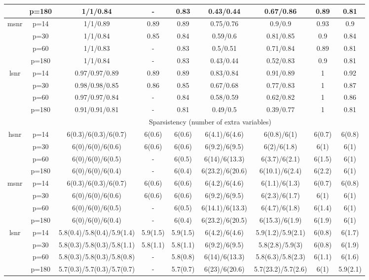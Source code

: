 \begin{table}[ht]
{\begin{tabular}{|c|c|ccccccc|}
   & p=180 & 1/1/0.84 & - & 0.83 & 0.43/0.44 & 0.67/0.86 & 0.89 & 0.81 \\ 
  \midrule\multirow{4}[2]{*}{msnr} & p=14 & 1/1/0.89 & 0.89 & 0.89 & 0.75/0.76 & 0.9/0.9 & 0.93 & 0.9 \\ 
   & p=30 & 1/1/0.84 & 0.85 & 0.84 & 0.59/0.6 & 0.81/0.85 & 0.9 & 0.84 \\ 
   & p=60 & 1/1/0.83 & - & 0.83 & 0.5/0.51 & 0.71/0.84 & 0.89 & 0.81 \\ 
   & p=180 & 1/1/0.84 & - & 0.83 & 0.43/0.44 & 0.52/0.83 & 0.9 & 0.81 \\ 
  \midrule\multirow{4}[2]{*}{lsnr} & p=14 & 0.97/0.97/0.89 & 0.89 & 0.89 & 0.83/0.84 & 0.91/0.89 & 1 & 0.92 \\ 
   & p=30 & 0.98/0.98/0.85 & 0.86 & 0.85 & 0.67/0.68 & 0.77/0.83 & 1 & 0.87 \\ 
   & p=60 & 0.97/0.97/0.84 & - & 0.84 & 0.58/0.59 & 0.62/0.82 & 1 & 0.86 \\ 
   & p=180 & 0.91/0.91/0.81 & - & 0.81 & 0.49/0.5 & 0.39/0.77 & 1 & 0.81 \\ 
   \midrule 
 \multicolumn{1}{|c}{} &       & \multicolumn{7}{c|}{Sparsistency (number of extra variables)} \\
\midrule\multirow{4}[2]{*}{hsnr} & p=14 & 6(0.3)/6(0.3)/6(0.7) & 6(0.6) & 6(0.6) & 6(4.1)/6(4.6) & 6(0.8)/6(1) & 6(0.7) & 6(0.8) \\ 
   & p=30 & 6(0)/6(0)/6(0.6) & 6(0.6) & 6(0.6) & 6(9.2)/6(9.5) & 6(2)/6(1.8) & 6(1) & 6(1) \\ 
   & p=60 & 6(0)/6(0)/6(0.5) & - & 6(0.5) & 6(14)/6(13.3) & 6(3.7)/6(2.1) & 6(1.5) & 6(1) \\ 
   & p=180 & 6(0)/6(0)/6(0.4) & - & 6(0.4) & 6(23.2)/6(20.6) & 6(10.1)/6(2.4) & 6(2.2) & 6(1) \\ 
  \midrule\multirow{4}[2]{*}{msnr} & p=14 & 6(0.3)/6(0.3)/6(0.7) & 6(0.6) & 6(0.6) & 6(4.2)/6(4.6) & 6(1.1)/6(1.3) & 6(0.7) & 6(0.8) \\ 
   & p=30 & 6(0)/6(0)/6(0.6) & 6(0.6) & 6(0.6) & 6(9.2)/6(9.5) & 6(2.3)/6(1.7) & 6(1) & 6(1) \\ 
   & p=60 & 6(0)/6(0)/6(0.5) & - & 6(0.5) & 6(14.1)/6(13.3) & 6(4.7)/6(1.8) & 6(1.4) & 6(1) \\ 
   & p=180 & 6(0)/6(0)/6(0.4) & - & 6(0.4) & 6(23.2)/6(20.5) & 6(15.3)/6(1.9) & 6(1.9) & 6(1) \\ 
  \midrule\multirow{4}[2]{*}{lsnr} & p=14 & 5.8(0.4)/5.8(0.4)/5.9(1.4) & 5.9(1.5) & 5.9(1.5) & 6(4.2)/6(4.6) & 5.9(1.2)/5.9(2.1) & 6(0.8) & 6(1.7) \\ 
   & p=30 & 5.8(0.3)/5.8(0.3)/5.8(1.1) & 5.8(1.1) & 5.8(1.1) & 6(9.2)/6(9.5) & 5.8(2.8)/5.9(3) & 6(0.8) & 6(1.9) \\ 
   & p=60 & 5.8(0.3)/5.8(0.3)/5.8(0.8) & - & 5.8(0.8) & 6(14)/6(13.3) & 5.8(6.3)/5.8(2.3) & 6(1.1) & 6(1.6) \\ 
   & p=180 & 5.7(0.3)/5.7(0.3)/5.7(0.7) & - & 5.7(0.7) & 6(23)/6(20.6) & 5.7(23.2)/5.7(2.6) & 6(1) & 5.9(2.1) \\ 
   \bottomrule 
\end{tabular}
}
\end{table}
